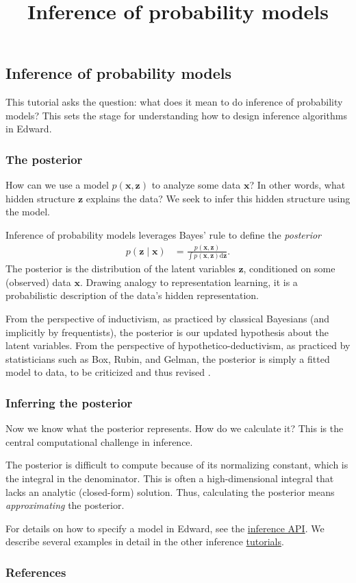\title{Inference of probability models}

\subsection{Inference of probability models}

This tutorial asks the question: what does it mean to do inference of
probability models? This sets the stage for understanding how to
design inference algorithms in Edward.

\subsubsection{The posterior}

How can we use a model $p(\mathbf{x}, \mathbf{z})$ to analyze some
data $\mathbf{x}$? In other words, what hidden structure $\mathbf{z}$
explains the data? We seek to infer this hidden structure using the
model.

Inference of probability models leverages Bayes' rule to define the
\emph{posterior}
\begin{align*}
  p(\mathbf{z} \mid \mathbf{x})
  &=
  \frac{p(\mathbf{x}, \mathbf{z})}{\int p(\mathbf{x}, \mathbf{z}) \text{d}\mathbf{z}}.
\end{align*}
The posterior is the distribution of the latent variables
$\mathbf{z}$, conditioned on some (observed) data $\mathbf{x}$.
Drawing analogy to representation learning, it is a probabilistic
description of the data's hidden representation.

From the perspective of inductivism, as practiced by classical
Bayesians (and implicitly by frequentists),
the posterior is our updated hypothesis about the latent variables.
From the perspective of hypothetico-deductivism, as practiced by
statisticians such as Box, Rubin, and Gelman, the posterior is simply
a fitted model to data, to be criticized and thus revised
\citep{box1982apology,gelman2013philosophy}.


\subsubsection{Inferring the posterior}

Now we know what the posterior represents. How do we calculate it? This is the
central computational challenge in inference.

The posterior is difficult to compute because of its normalizing
constant, which is the integral in the denominator.
This is often a high-dimensional integral that lacks an analytic (closed-form)
solution. Thus, calculating the posterior means \emph{approximating} the
posterior.

For details on how to specify a model in Edward, see the
\href{/api/inference}{inference API}. We describe several examples in
detail in the other inference \href{/tutorials/}{tutorials}.


\subsubsection{References}\label{references}

